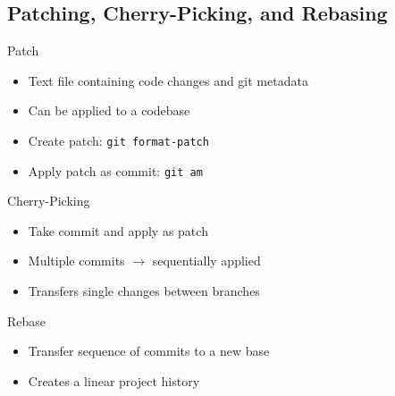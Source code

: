 \subsection{Patching, Cherry-Picking, and Rebasing}
\begin{frame}{\insertsubsection}
	\begin{fancycolumns}[animation=none]
		{\small
			\begin{definition}{Patch}
				\begin{itemize}
					\item Text file containing code changes and git metadata
					\item Can be applied to a codebase
					\item Create patch: \texttt{git format-patch}
					\item Apply patch as commit: \texttt{git am}
				\end{itemize}
			\end{definition}\pause
			\begin{definition}{Cherry-Picking}
				\begin{itemize}
					\item Take commit and apply as patch
					\item Multiple commits $\rightarrow$ sequentially applied
					\item Transfers single changes between branches
				\end{itemize}
			\end{definition}\pause
			\begin{definition}{Rebase}
				\begin{itemize}
					\item Transfer sequence of commits to a new base
					\item Creates a linear project history
				\end{itemize}
			\end{definition}\pause
		}
		\nextcolumn
		\begin{center}


\end{center}
\end{fancycolumns}
\end{frame}
